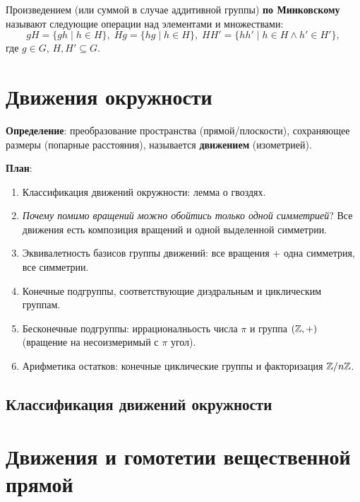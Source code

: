 Произведением (или суммой в случае аддитивной группы) \textbf{по Минковскому} называют следующие операции над элементами и множествами:
$$
gH=\{gh\;|\;h\in H\},\;Hg=\{hg\;|\;h\in H\},\;HH'=\{hh'\;|\;h\in H\land h'\in H'\},
$$
где $g\in G$, $H,H'\subseteq G$.




\section{Движения окружности}
 

\textbf{Определение}: преобразование пространства (прямой/плоскости), сохраняющее размеры (попарные расстояния), называется \textbf{движением} (изометрией).

\textbf{План}:

\begin{enumerate}
\item Классификация движений окружности: лемма о гвоздях.
\item \textit{Почему помимо вращений можно обойтись только одной симметрией}? Все движения есть композиция вращений и одной выделенной симметрии.
\item Эквивалетность базисов группы движений: все вращения + одна симметрия, все симметрии.
\item Конечные подгруппы, соответствующие диэдральным и циклическим группам.
\item Бесконечные подгруппы: иррационалньость числа $\pi$ и группа $(\mathbb Z,+)$ (вращение на несоизмеримый с $\pi$ угол).
\item Арифметика остатков: конечные циклические группы и факторизация $\mathbb Z/n\mathbb Z$.
\end{enumerate}


\subsection{Классификация движений окружности}







\section{Движения и гомотетии вещественной прямой}



